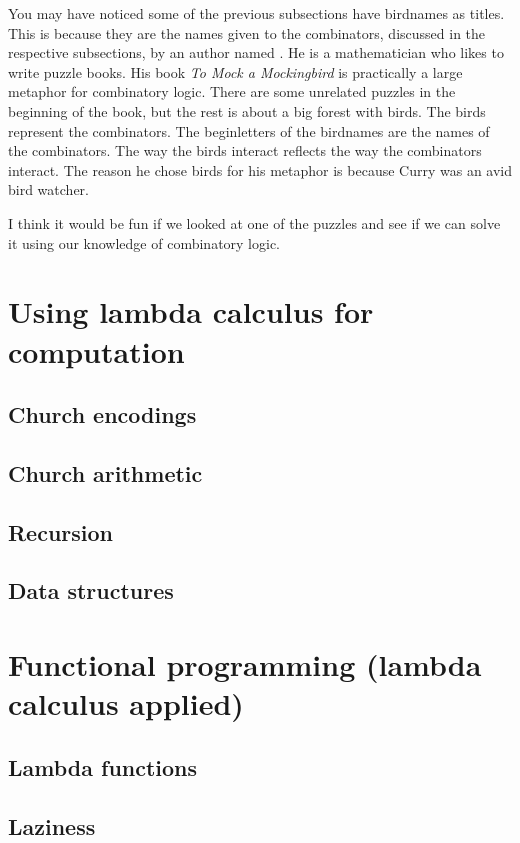 \documentclass[11pt]{book}
\begin{document}
You may have noticed some of the previous subsections have birdnames as titles.
This is because they are the names given to the combinators, discussed in the
respective subsections, by an author named \textcite{smullyan2000}. He is a
mathematician who likes to write puzzle books. His book \emph{To Mock a
Mockingbird} is practically a large metaphor for combinatory logic. There are
some unrelated puzzles in the beginning of the book, but the rest is about a
big forest with birds. The birds represent the combinators. The beginletters of
the birdnames are the names of the combinators. The way the birds interact
reflects the way the combinators interact. The reason he chose birds for his
metaphor is because Curry was an avid bird watcher.

I think it would be fun if we looked at one of the puzzles and see if we can
solve it using our knowledge of combinatory logic.

\chapter{Using lambda calculus for computation}

\section{Church encodings}

\section{Church arithmetic}

\section{Recursion}

\section{Data structures}

\chapter{Functional programming (lambda calculus applied)}

\section{Lambda functions}

\section{Laziness}
\end{document}
